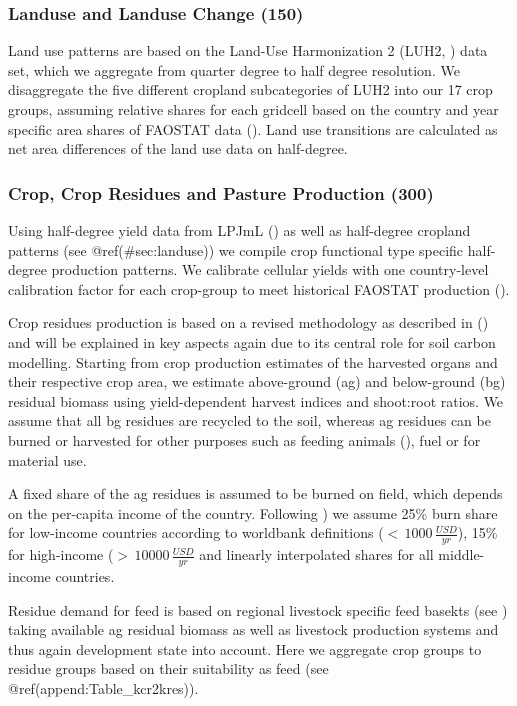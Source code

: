 \documentclass[gc, manuscript]{copernicus}
\begin{document}
\hypertarget{sec:landuse}{%
\subsubsection{Landuse and Landuse Change (150)}\label{sec:landuse}}

Land use patterns are based on the Land-Use Harmonization 2 (LUH2,
\citep{LUH2}) data set, which we aggregate from quarter degree to half
degree resolution. We disaggregate the five different cropland
subcategories of LUH2 into our 17 crop groups, assuming relative shares
for each gridcell based on the country and year specific area shares of
FAOSTAT data (\citep{FAOSTAT}). Land use transitions are calculated as
net area differences of the land use data on half-degree.

\subsubsection{Crop, Crop Residues and Pasture Production (300)}

Using half-degree yield data from LPJmL (\citep{LPJmL4_1}) as well as
half-degree cropland patterns (see @ref(\#sec:landuse)) we compile crop
functional type specific half-degree production patterns. We calibrate
cellular yields with one country-level calibration factor for each
crop-group to meet historical FAOSTAT production (\citep{FAOSTAT}).

Crop residues production is based on a revised methodology as described
in (\citep{bodirsky2012}) and will be explained in key aspects again due
to its central role for soil carbon modelling. Starting from crop
production estimates of the harvested organs and their respective crop
area, we estimate above-ground (ag) and below-ground (bg) residual
biomass using yield-dependent harvest indices and shoot:root ratios. We
assume that all bg residues are recycled to the soil, whereas ag
residues can be burned or harvested for other purposes such as feeding
animals (\citep{weindl}), fuel or for material use.

A fixed share of the ag residues is assumed to be burned on field, which
depends on the per-capita income of the country. Following
\citep{smil1999}) we assume 25\% burn share for low-income countries
according to worldbank definitions (\(<\,1000\,\tfrac{USD}{yr}\)), 15\%
for high-income (\(>\,10000\,\tfrac{USD}{yr}\) and linearly interpolated
shares for all middle-income countries.

Residue demand for feed is based on regional livestock specific feed
basekts (see \citep{weindl}) taking available ag residual biomass as
well as livestock production systems and thus again development state
into account. Here we aggregate crop groups to residue groups based on
their suitability as feed (see @ref(append:Table\_kcr2kres)).
\end{document}
